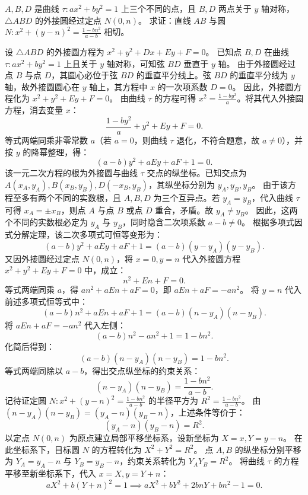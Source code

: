\begin{example}
$A,B,D$ 是曲线 $\tau: ax^2 + by^2 = 1$ 上三个不同的点，且 $B,D$ 两点关于 $y$ 轴对称，$\triangle ABD$ 的外接圆经过定点 $N(0,n)$。
求证：直线 $AB$ 与圆 $N: x^2 + (y - n)^2 = \frac{1 - bn^2}{a - b}$ 相切。
\end{example}
\begin{solution}
设 $\triangle ABD$ 的外接圆方程为 $x^2 + y^2 + D x + E y + F = 0$。
已知点 $B, D$ 在曲线 $\tau: ax^2 + by^2 = 1$ 上且关于 $y$ 轴对称，可知弦 $BD$ 垂直于 $y$ 轴。
由于外接圆经过点 $B$ 与点 $D$，其圆心必位于弦 $BD$ 的垂直平分线上。弦 $BD$ 的垂直平分线为 $y$ 轴，故外接圆圆心在 $y$ 轴上，其方程中 $x$ 的一次项系数 $D = 0$。
因此，外接圆方程化为 $x^2 + y^2 + E y + F = 0$。
由曲线 $\tau$ 的方程可得 $x^2 = \frac{1 - by^2}{a}$。将其代入外接圆方程，消去变量 $x$：
\[ \frac{1 - by^2}{a} + y^2 + E y + F = 0. \]
等式两端同乘非零常数 $a$（若 $a=0$，则曲线 $\tau$ 退化，不符合题意，故 $a \neq 0$），并按 $y$ 的降幂整理，得：
\[ (a - b)y^2 + aE y + aF + 1 = 0. \]
该一元二次方程的根为外接圆与曲线 $\tau$ 交点的纵坐标。已知交点为 $A(x_A, y_A), B(x_B, y_B), D(-x_B, y_B)$，其纵坐标分别为 $y_A, y_B, y_B$。
由于该方程至多有两个不同的实数根，且 $A, B, D$ 为三个互异点。若 $y_A = y_B$，代入曲线 $\tau$ 可得 $x_A = \pm x_B$，则点 $A$ 与点 $B$ 或点 $D$ 重合，矛盾。故 $y_A \neq y_B$。
因此，这两个不同的实数根必定为 $y_A$ 与 $y_B$，同时隐含二次项系数 $a - b \neq 0$。
根据多项式因式分解定理，该二次多项式可恒等变形为：
\[ (a - b)y^2 + aE y + aF + 1 = (a - b)(y - y_A)(y - y_B). \]
又因外接圆经过定点 $N(0, n)$，将 $x = 0, y = n$ 代入外接圆方程 $x^2 + y^2 + E y + F = 0$ 中，成立：
\[ n^2 + E n + F = 0. \]
等式两端同乘 $a$，得 $an^2 + aE n + aF = 0$，即 $aE n + aF = -an^2$。
将 $y = n$ 代入前述多项式恒等式中：
\[ (a - b)n^2 + aE n + aF + 1 = (a - b)(n - y_A)(n - y_B). \]
将 $aE n + aF = -an^2$ 代入左侧：
\[ (a - b)n^2 - an^2 + 1 = 1 - bn^2. \]
化简后得到：
\[ (a - b)(n - y_A)(n - y_B) = 1 - bn^2. \]
等式两端同除以 $a - b$，得出交点纵坐标的约束关系：
\[ (n - y_A)(n - y_B) = \frac{1 - bn^2}{a - b}. \]
记待证定圆 $N: x^2 + (y - n)^2 = \frac{1 - bn^2}{a - b}$ 的半径平方为 $R^2 = \frac{1 - bn^2}{a - b}$。
由 $(n - y_A)(n - y_B) = (y_A - n)(y_B - n)$，上述条件等价于：
\[ (y_A - n)(y_B - n) = R^2. \]
以定点 $N(0, n)$ 为原点建立局部平移坐标系，设新坐标为 $X = x, Y = y - n$。
在此坐标系下，目标圆 $N$ 的方程转化为 $X^2 + Y^2 = R^2$。
点 $A, B$ 的纵坐标分别平移为 $Y_A = y_A - n$ 与 $Y_B = y_B - n$，约束关系转化为 $Y_A Y_B = R^2$。
将曲线 $\tau$ 的方程平移至新坐标系下，代入 $x = X, y = Y + n$：
\[ aX^2 + b(Y + n)^2 = 1 \implies aX^2 + bY^2 + 2bnY + bn^2 - 1 = 0. \]

\end{solution}

